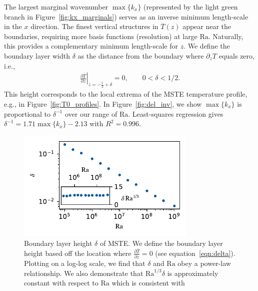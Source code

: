 \documentclass[reprint,amsmath,amssymb,aps,nofootinbib]{revtex4-1}
\newcommand\Ra{\mathrm{Ra}}
\renewcommand{\vec}[1]{\boldsymbol{#1}}
\begin{document}
The largest marginal wavenumber $\max \{ k_x \}$ (represented by the light green branch in Figure~\ref{fig:kx_marginals}) serves as an inverse minimum length-scale in the $x$ direction.
The finest vertical structures in $\overline{T}(z)$ appear near the boundaries, requiring more basis functions (resolution) at large $\Ra$.
Naturally, this provides a complementary minimum length-scale for $z$.
We define the boundary layer width $\delta$ as the distance from the boundary where $\partial_z T$ equals zero, i.e.,
\begin{align}\label{eqn:delta}
    \left.\frac{\partial \overline{T}}{\partial z}\right|_{z=-\frac{1}{2}+\delta} = 0, \qquad 0 < \delta < 1/2.
\end{align}
This height corresponds to the local extrema of the MSTE temperature profile, e.g., in Figure~\ref{fig:T0_profiles}.
In Figure~\ref{fig:del_inv}, we show $\max \{ k_x\}$ is proportional to $\delta^{-1}$ over our range of $\Ra$.
Least-squares regression gives $\delta^{-1} = 1.71 \max \{ k_x \} - 2.13$ with $R^2 = 0.996$.

\begin{figure}
    \centering
    \includegraphics[width=3.375in]{del_ra.pdf}
    \caption{Boundary layer height $\delta$ of MSTE. 
    We define the boundary layer height based off the location where $\frac{\partial \overline{T}}{\partial z} = 0$ (see equation~\ref{eqn:delta}). 
    Plotting on a log-log scale, we find that $\delta$ and $\Ra$ obey a power-law relationship. We also demonstrate that $\Ra^{1/3}\delta$ is approximately constant with respect to $\Ra$ which is consistent with \cite{Malkus_1954}}
    \label{fig:bl_ra}
\end{figure}
\end{document}
